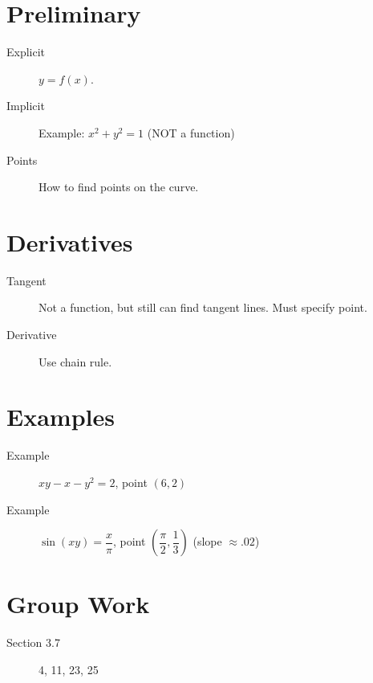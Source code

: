 \documentclass[11pt]{article}
\begin{document}
\drawtitle

\section*{Preliminary}
\begin{description}
\item[Explicit] $y=f(x)$.
\item[Implicit] Example: $x^2+y^2=1$ (NOT a function)
\item[Points] How to find points on the curve.
\end{description}

\section*{Derivatives}
\begin{description}
\item[Tangent] Not a function, but still can find tangent lines.  Must
  specify point.
  \item[Derivative] Use chain rule.
\end{description}

\section*{Examples}
\begin{description}
\item[Example] $xy-x-y^2=2$, point $(6,2)$
\item[Example] $\sin(xy)=\dfrac{x}{\pi}$, point
  $\left(\dfrac{\pi}{2},\dfrac{1}{3}\right)$ (slope $\approx .02$)
\end{description}

\section*{Group Work}
\begin{description}
\item[Section 3.7] 4, 11, 23, 25
\end{description}
\end{document}
